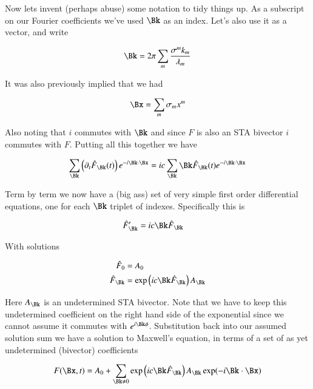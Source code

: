 \documentclass{article}
\begin{document}
Now lets invent (perhaps abuse) some notation to tidy things up.  As a subscript on our Fourier coefficients we've used $\Bk$ as an index.  Let's also use it as a vector, and write

\begin{align*}
\Bk = 2 \pi \sum_m \frac{\sigma^m k_m}{\lambda_m}
\end{align*}

It was also previously implied that we had

\begin{align*}
\Bx = \sum_m \sigma_m x^m
\end{align*}

Also noting that $i$ commutes with $\Bk$ and since $F$ is also an STA bivector $i$ commutes with $F$.  Putting all this together we have

\begin{align*}
\sum_{\Bk} \left(\partial_t \hat{F}_{\Bk}(t) \right) e^{-i \Bk \cdot \Bx }
&= i c \sum_{\Bk} \Bk \hat{F}_{\Bk}(t) e^{- i \Bk \cdot \Bx } \\
\end{align*}

Term by term we now have a (big ass) set of very simple first order differential equations, one for each $\Bk$ triplet of indexes.  Specifically this is

\begin{align*}
\hat{F}_{\Bk}' &= i c \Bk \hat{F}_{\Bk}
\end{align*}

With solutions

\begin{align*}
\hat{F}_{0} &= A_{0} \\
\hat{F}_{\Bk} &= \exp\left(i c \Bk \hat{F}_{\Bk}\right) A_{\Bk} \\
\end{align*}

Here $A_{\Bk}$ is an undetermined STA bivector.  Note that we have to keep this undetermined coefficient on the right hand side of the exponential since we cannot assume it commutes with $e^{i\Bk\phi}$.  Substitution back into our assumed solution sum we have a solution to Maxwell's equation, in terms of a set of as yet undetermined (bivector) coefficients

\begin{align}
F(\Bx,t) = A_0 + \sum_{\Bk \ne 0} \exp\left(i c \Bk \hat{F}_{\Bk}\right) A_{\Bk} \exp(-i \Bk \cdot \Bx )
\end{align}



\end{document}

